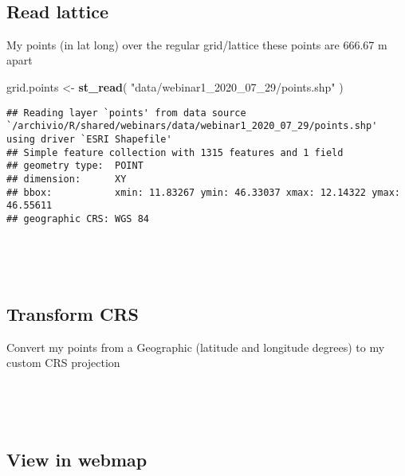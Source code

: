 \documentclass[]{article}
\newenvironment{Shaded}{\begin{snugshade}}{\end{snugshade}}
\newcommand{\KeywordTok}[1]{\textcolor[rgb]{0.13,0.29,0.53}{\textbf{#1}}}
\newcommand{\NormalTok}[1]{#1}
\newcommand{\OperatorTok}[1]{\textcolor[rgb]{0.81,0.36,0.00}{\textbf{#1}}}
\newcommand{\StringTok}[1]{\textcolor[rgb]{0.31,0.60,0.02}{#1}}
\begin{document}
~\\
\hspace*{0.333em}

\hypertarget{read-lattice}{%
\subsection{Read lattice}\label{read-lattice}}

My points (in lat long) over the regular grid/lattice these points are
666.67 m apart

\begin{Shaded}
\begin{Highlighting}[]
\NormalTok{grid.points <-}\StringTok{ }\KeywordTok{st_read}\NormalTok{( }\StringTok{"data/webinar1_2020_07_29/points.shp"}\NormalTok{ )}
\end{Highlighting}
\end{Shaded}

\begin{verbatim}
## Reading layer `points' from data source `/archivio/R/shared/webinars/data/webinar1_2020_07_29/points.shp' using driver `ESRI Shapefile'
## Simple feature collection with 1315 features and 1 field
## geometry type:  POINT
## dimension:      XY
## bbox:           xmin: 11.83267 ymin: 46.33037 xmax: 12.14322 ymax: 46.55611
## geographic CRS: WGS 84
\end{verbatim}

~

~

\hypertarget{transform-crs}{%
\subsection{Transform CRS}\label{transform-crs}}

Convert my points from a Geographic (latitude and longitude degrees) to
my custom CRS projection

\begin{Shaded}
\end{Shaded}

~

~

\hypertarget{view-in-webmap}{%
\subsection{View in webmap}\label{view-in-webmap}}
\end{document}
